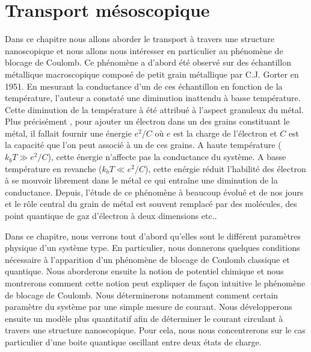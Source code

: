 


\chapter{Transport mésoscopique}


Dans ce chapitre nous allons aborder le transport à travers une structure nanoscopique et nous allons nous intéresser en particulier au phénomène de blocage de Coulomb. Ce phénomène a d'abord été observé sur des échantillon métallique macroscopique composé de petit grain métallique par C.J. Gorter en 1951. En mesurant la conductance d'un de ces échantillon en fonction de la température, l'auteur a constaté une diminution inattendu à basse température. Cette diminution de la température à été attribué à l'aspect granuleux du métal. Plus précisément , pour ajouter un électron dans un des grains constituant le métal, il fallait fournir une énergie $e^2/C$ où $e$ est la charge de l'électron et $C$ est la capacité que l'on peut associé à un de ces grains. A haute température ($k_bT \gg e^2/C$), cette énergie n'affecte pas la conductance du système. A basse température en revanche ($k_bT \ll e^2/C$), cette enérgie réduit l'habilité des électron à se mouvoir librement dans le métal ce qui entraîne une diminution de la conductance. Depuis, l'étude de ce phénomène à beaucoup évolué et de nos jours et le rôle central du grain de métal est souvent remplacé par des molécules, des point quantique de gaz d'électron à deux dimensions etc..

Dans ce chapitre, nous verrons tout d'abord qu'elles sont le différent paramètres physique d'un système type. En particulier, nous donnerons quelques conditions nécessaire à l'apparition d'un phénomène de blocage de Coulomb classique et quantique. Nous aborderons ensuite la notion de potentiel chimique et nous montrerons comment cette notion peut expliquer de façon intuitive le phénomène de blocage de Coulomb. Nous déterminerons notamment comment certain paramètre du système par une simple mesure de courant. Nous développerons ensuite un modèle plus quantitatif afin de déterminer le courant circulant à travers une structure nanoscopique. Pour cela, nous nous concentrerons sur le cas particulier d'une boite quantique oscillant entre deux états de charge.


